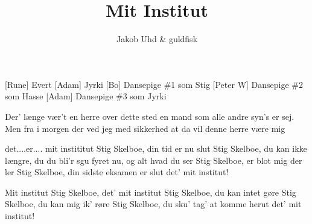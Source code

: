 \documentclass[a4paper]{article}
\title{Mit Institut}
\author{Jakob Uhd \& guldfisk}
\begin{document}
\maketitle

\begin{roles}
  [Rune] Evert
  [Adam] Jyrki
  [Bo] Dansepige \#1 som Stig
  [Peter W] Dansepige \#2 som Hasse
  [Adam] Dansepige \#3 som Jyrki
\end{roles}

\begin{song}

Der' længe vær't en herre over dette sted
en mand som alle andre syn's er sej.
Men fra i morgen der ved jeg med sikkerhed
at da vil denne herre være mig

det....er.... mit instititut
Stig Skelboe, din
tid er nu slut
Stig Skelboe, du
kan ikke længre, du
du bli'r sgu
fyret nu, og alt hvad du ser
Stig Skelboe, er
blot mig der ler
Stig Skelboe, din
sidste eksamen er slut
det' mit institut!


Mit institut
Stig Skelboe, det'
mit institut
Stig Skelboe, du
kan intet gøre
Stig Skelboe, du
kan mig ik' røre
Stig Skelboe, du
sku' tag' at komme herut
det' mit institut!

\end{song}
\end{document}
